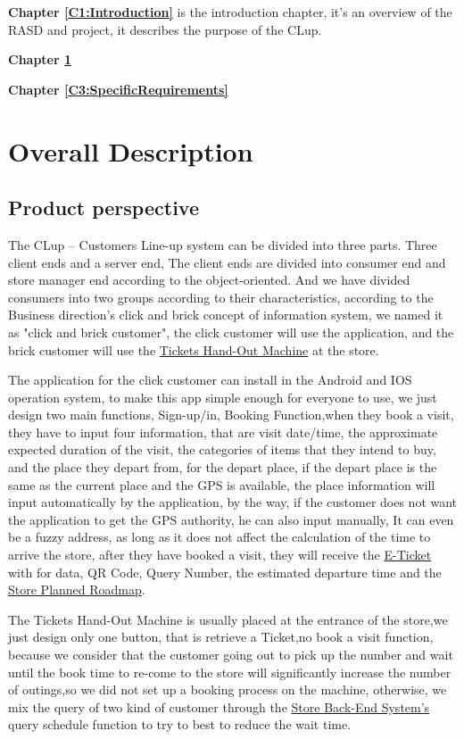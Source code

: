 \documentclass[a4paper,12pt]{book}
\begin{document}
\textbf{Chapter \ref{C1:Introduction}} is the introduction chapter, it's an overview of the RASD and project, 
it describes the purpose of the CLup.

\textbf{Chapter \ref{C2:OverallDescription}} 

\textbf{Chapter \ref{C3:SpecificRequirements}} 






\chapter{Overall Description} \label{C2:OverallDescription}
\section{Product perspective}

The CLup – Customers Line-up system can be divided into three parts. Three client ends and a server end, The client ends are divided into consumer end and store manager end according to the object-oriented. And we have divided consumers into two groups according to their characteristics, according to the Business direction's click and brick concept of information system, we named it as "click and brick customer", the click customer will use the application, and the brick customer will use the \hyperref[Definitions]{Tickets Hand-Out Machine} at the store.

The application for the click customer can install in the Android and IOS operation system, to make this app simple enough for everyone to use, we just design two main functions, Sign-up/in, Booking Function,when they book a visit, they have to input four information, that are visit date/time, the approximate expected duration of the visit, the categories of items that they intend to buy, and the place they depart from, for the depart place, if the depart place is the same as the current place and the GPS is available, the place information will input automatically by the application, by the way, if the customer does not want the application to get the GPS authority, he can also input manually, It can even be a fuzzy address, as long as it does not affect the calculation of the time to arrive the store, after they have booked a visit, they will receive the \hyperref[Definitions]{E-Ticket} with for data, QR Code, Query Number, the estimated departure time and the \hyperref[Definitions]{Store Planned Roadmap}.

The Tickets Hand-Out Machine is usually placed at the entrance of the store,we just design only one button, that is retrieve a Ticket,no book a visit function, because we consider that the customer going out to pick up the number and wait until the book time to re-come to the store will significantly increase the number of outings,so we did not set up a booking process on the machine, otherwise, we mix the query of two kind of customer through the \hyperref[Definitions]{Store Back-End System's} query schedule function to try to best to reduce the wait time.
\end{document}
